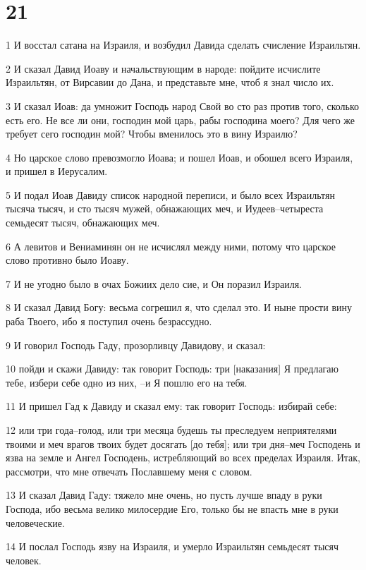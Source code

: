 \chapter{21}

\par 1 И восстал сатана на Израиля, и возбудил Давида сделать счисление Израильтян.
\par 2 И сказал Давид Иоаву и начальствующим в народе: пойдите исчислите Израильтян, от Вирсавии до Дана, и представьте мне, чтоб я знал число их.
\par 3 И сказал Иоав: да умножит Господь народ Свой во сто раз против того, сколько есть его. Не все ли они, господин мой царь, рабы господина моего? Для чего же требует сего господин мой? Чтобы вменилось это в вину Израилю?
\par 4 Но царское слово превозмогло Иоава; и пошел Иоав, и обошел всего Израиля, и пришел в Иерусалим.
\par 5 И подал Иоав Давиду список народной переписи, и было всех Израильтян тысяча тысяч, и сто тысяч мужей, обнажающих меч, и Иудеев--четыреста семьдесят тысяч, обнажающих меч.
\par 6 А левитов и Вениаминян он не исчислял между ними, потому что царское слово противно было Иоаву.
\par 7 И не угодно было в очах Божиих дело сие, и Он поразил Израиля.
\par 8 И сказал Давид Богу: весьма согрешил я, что сделал это. И ныне прости вину раба Твоего, ибо я поступил очень безрассудно.
\par 9 И говорил Господь Гаду, прозорливцу Давидову, и сказал:
\par 10 пойди и скажи Давиду: так говорит Господь: три [наказания] Я предлагаю тебе, избери себе одно из них, --и Я пошлю его на тебя.
\par 11 И пришел Гад к Давиду и сказал ему: так говорит Господь: избирай себе:
\par 12 или три года--голод, или три месяца будешь ты преследуем неприятелями твоими и меч врагов твоих будет досягать [до тебя]; или три дня--меч Господень и язва на земле и Ангел Господень, истребляющий во всех пределах Израиля. Итак, рассмотри, что мне отвечать Пославшему меня с словом.
\par 13 И сказал Давид Гаду: тяжело мне очень, но пусть лучше впаду в руки Господа, ибо весьма велико милосердие Его, только бы не впасть мне в руки человеческие.
\par 14 И послал Господь язву на Израиля, и умерло Израильтян семьдесят тысяч человек.
